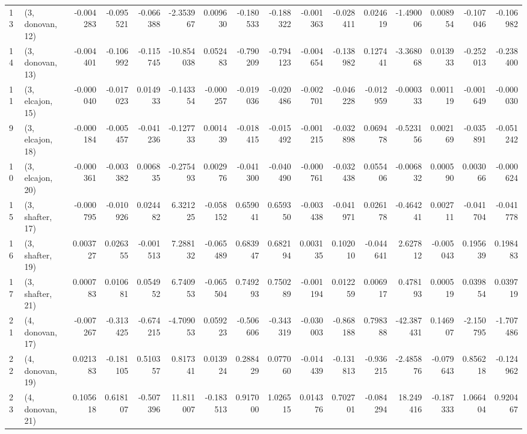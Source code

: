 \begin{tabular}{llrrrrrrrrrrrrrr}
13 &  (3, donovan, 12) &  -0.004283 & -0.095521 & -0.066388 &  -2.353967 &  0.009630 &  -0.180533 & -0.188322 & -0.001363 & -0.028411 &  0.024619 &  -1.490006 &  0.008954 & -0.107046 & -0.106982 \\
14 &  (3, donovan, 13) &  -0.004401 & -0.106992 & -0.115745 & -10.854038 &  0.052483 &  -0.790209 & -0.794123 & -0.004654 & -0.138982 &  0.127441 &  -3.368068 &  0.013933 & -0.252013 & -0.238400 \\
11 &  (3, elcajon, 15) &  -0.000040 & -0.017023 &  0.014933 &  -0.143354 & -0.000257 &  -0.019036 & -0.020486 & -0.002701 & -0.046228 & -0.012959 &  -0.000333 &  0.001119 & -0.001649 & -0.000030 \\
9  &  (3, elcajon, 18) &  -0.000184 & -0.005457 & -0.041236 &  -0.127733 &  0.001439 &  -0.018415 & -0.015492 & -0.001215 & -0.032898 &  0.069478 &  -0.523156 &  0.002169 & -0.035891 & -0.051242 \\
10 &  (3, elcajon, 20) &  -0.000361 & -0.003382 &  0.006835 &  -0.275493 &  0.002976 &  -0.041300 & -0.040490 & -0.000761 & -0.032438 &  0.055406 &  -0.006832 &  0.000590 &  0.003066 & -0.000624 \\
15 &  (3, shafter, 17) &  -0.000795 & -0.010926 &  0.024482 &   6.321225 & -0.058152 &   0.659041 &  0.659350 & -0.003438 & -0.041971 &  0.026178 &  -0.464241 &  0.002711 & -0.041704 & -0.041778 \\
16 &  (3, shafter, 19) &   0.003727 &  0.026355 & -0.001513 &   7.288132 & -0.065489 &   0.683947 &  0.682194 &  0.003135 &  0.102010 & -0.044641 &   2.627812 & -0.005043 &  0.195639 &  0.198483 \\
17 &  (3, shafter, 21) &   0.000783 &  0.010681 &  0.054952 &   6.740953 & -0.065504 &   0.749293 &  0.750289 & -0.001194 &  0.012259 &  0.006917 &   0.478193 &  0.000519 &  0.039854 &  0.039719 \\
21 &  (4, donovan, 17) &  -0.007267 & -0.313425 & -0.674215 &  -4.709053 &  0.059223 &  -0.506606 & -0.343319 & -0.030003 & -0.868188 &  0.798388 & -42.387431 &  0.146907 & -2.150795 & -1.707486 \\
22 &  (4, donovan, 19) &   0.021383 & -0.181105 &  0.510357 &   0.817341 &  0.013924 &   0.288429 &  0.077060 & -0.014439 & -0.131813 & -0.936215 &  -2.485876 & -0.079643 &  0.856218 & -0.124962 \\
23 &  (4, donovan, 21) &   0.105618 &  0.618107 & -0.507396 &  11.811007 & -0.183513 &   0.917000 &  1.026515 &  0.014376 &  0.702701 & -0.084294 &  18.249416 & -0.187333 &  1.066404 &  0.920467 \\

\end{tabular}
